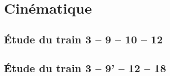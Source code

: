 \documentclass[10pt,fleqn]{article} %
\begin{document}
\section{Cinématique}
\subsection{Étude du train 3 -- 9 -- 10 -- 12}

\subsection{Étude du train 3 -- 9' -- 12 -- 18}


\end{document}
